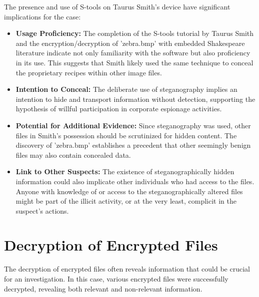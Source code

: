 The presence and use of S-tools on Taurus Smith's device have significant implications for the case:
\begin{itemize}
    \item \textbf{Usage Proficiency:} The completion of the S-tools tutorial by Taurus Smith and the encryption/decryption of 'zebra.bmp' with embedded Shakespeare literature indicate not only familiarity with the software but also proficiency in its use. This suggests that Smith likely used the same technique to conceal the proprietary recipes within other image files.
    \item \textbf{Intention to Conceal:} The deliberate use of steganography implies an intention to hide and transport information without detection, supporting the hypothesis of willful participation in corporate espionage activities.
    \item \textbf{Potential for Additional Evidence:} Since steganography was used, other files in Smith's possession should be scrutinized for hidden content. The discovery of 'zebra.bmp' establishes a precedent that other seemingly benign files may also contain concealed data.
    \item \textbf{Link to Other Suspects:} The existence of steganographically hidden information could also implicate other individuals who had access to the files. Anyone with knowledge of or access to the steganographically altered files might be part of the illicit activity, or at the very least, complicit in the suspect's actions.
\end{itemize}

\section{Decryption of Encrypted Files}
The decryption of encrypted files often reveals information that could be crucial for an investigation. In this case, various encrypted files were successfully decrypted, revealing both relevant and non-relevant information.

